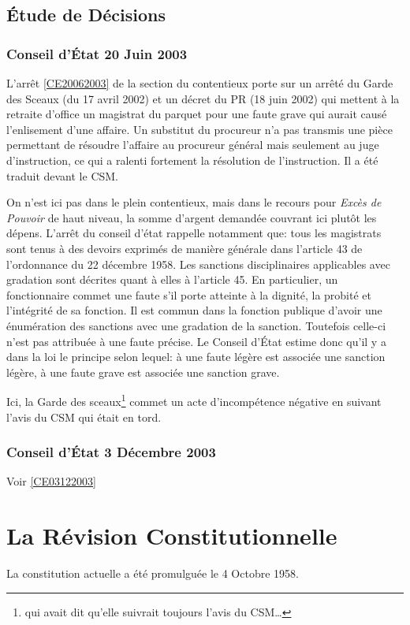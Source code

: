 \documentclass[math]{cours}
\begin{document}
\subsection{Étude de Décisions}
\subsubsection{Conseil d'État 20 Juin 2003}
L'arrêt \ref{CE20062003} de la section du contentieux porte sur un arrêté du Garde des Sceaux (du 17 avril 2002) et un décret du PR (18 juin 2002) qui mettent à la retraite d'office un magistrat du parquet pour une faute grave qui aurait causé l'enlisement d'une affaire.
Un substitut du procureur n'a pas transmis une pièce permettant de résoudre l'affaire au procureur général mais seulement au juge d'instruction, ce qui a ralenti fortement la résolution de l'instruction.
Il a été traduit devant le CSM.

On n'est ici pas dans le plein contentieux, mais dans le recours pour \emph{Excès de Pouvoir} de haut niveau, la somme d'argent demandée couvrant ici plutôt les dépens.
L'arrêt du conseil d'état rappelle notamment que: tous les magistrats sont tenus à des devoirs exprimés de manière générale dans l'article 43 de l'ordonnance du 22 décembre 1958.
Les sanctions disciplinaires applicables avec gradation sont décrites quant à elles à l'article 45.
En particulier, un fonctionnaire commet une faute s'il porte atteinte à la dignité, la probité et l'intégrité de sa fonction.
Il est commun dans la fonction publique d'avoir une énumération des sanctions avec une gradation de la sanction. Toutefois celle-ci n'est pas attribuée à une faute précise.
Le Conseil d'État estime donc qu'il y a dans la loi le principe selon lequel: à une faute légère est associée une sanction légère, à une faute grave est associée une sanction grave.

Ici, la Garde des sceaux\footnote{qui avait dit qu'elle suivrait toujours l'avis du CSM\ldots} commet un acte d'incompétence négative en suivant l'avis du CSM qui était en tord.

\subsubsection{Conseil d'État 3 Décembre 2003}
Voir \ref{CE03122003}

\section{La Révision Constitutionnelle}
La constitution actuelle a été promulguée le 4 Octobre 1958.
\end{document}
